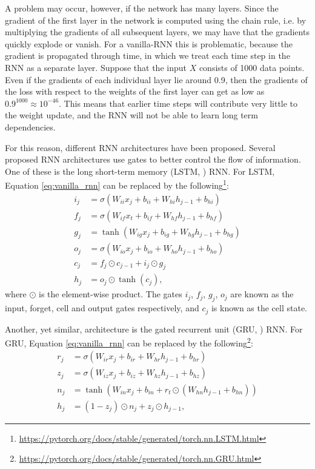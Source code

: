 A problem may occur, however, if the network has many layers. Since the gradient of the first layer in the network is computed using the chain rule, i.e. by multiplying the gradients of all subsequent layers, we may have that the gradients quickly explode or vanish. For a vanilla-RNN this is problematic, because the gradient is propagated through time, in which we treat each time step in the RNN as a separate layer. Suppose that the input $X$ consists of 1000 data points. Even if the gradients of each individual layer lie around 0.9, then the gradients of the loss with respect to the weights of the first layer can get as low as $0.9^{1000}\approx10^{-46}$. This means that earlier time steps will contribute very little to the weight update, and the RNN will not be able to learn long term dependencies.

For this reason, different RNN architectures have been proposed. Several proposed RNN architectures use gates to better control the flow of information. One of these is the long short-term memory (LSTM, \cite{hochreiter1997long}) RNN. For LSTM, Equation \ref{eq:vanilla_rnn} can be replaced by the following\footnote{\url{https://pytorch.org/docs/stable/generated/torch.nn.LSTM.html}}: 
\begin{align}
    i_j &= \sigma(W_{ii}x_j + b_{ii} + W_{hi}h_{j-1} + b_{hi}) \\
    f_j &= \sigma(W_{if}x_t + b_{if} + W_{hf}h_{j-1} + b_{hf}) \\
    g_j &= \tanh(W_{ig}x_j + b_{ig} + W_{hg}h_{j-1} + b_{hg}) \\
    o_j &= \sigma(W_{io}x_j + b_{io} + W_{ho}h_{j-1} + b_{ho}) \\
    c_j &= f_j \odot c_{j-1} + i_j \odot g_j \\
    h_j &= o_j \odot \tanh(c_j),
\end{align}
where  $\odot$ is the element-wise product. The gates $i_j$, $f_j$, $g_j$, $o_j$ are known as the input, forget, cell and output gates respectively, and $c_j$ is known as the cell state. 

Another, yet similar, architecture is the gated recurrent unit (GRU, \cite{cho2014learning}) RNN. For GRU, Equation \ref{eq:vanilla_rnn} can be replaced by the following\footnote{\url{https://pytorch.org/docs/stable/generated/torch.nn.GRU.html}}:
\begin{align}
    r_j &= \sigma(W_{ir}x_j + b_{ir} + W_{hr}h_{j-1} + b_{hr}) \\
    z_j &= \sigma(W_{iz}x_j + b_{iz} + W_{hz}h_{j-1} + b_{hz}) \\   
    n_j &= \tanh(W_{in}x_j + b_{in} + r_t \odot (W_{hn}h_{j-1} + b_{hn})) \\
    h_j &= (1 - z_j) \odot n_j + z_j \odot h_{j-1},
\end{align}


